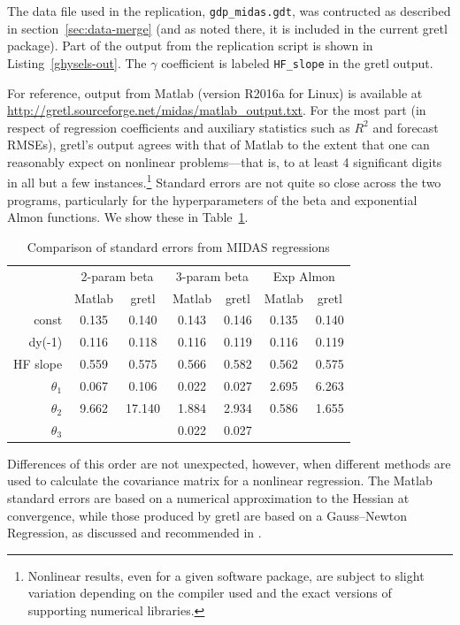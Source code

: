 \documentclass{article}
\begin{document}
The data file used in the replication, \texttt{gdp\_midas.gdt}, was
contructed as described in section~\ref{sec:data-merge} (and as noted
there, it is included in the current gretl package). Part of the
output from the replication script is shown in
Listing~\ref{ghysels-out}. The $\gamma$ coefficient is labeled
\texttt{HF\_slope} in the gretl output.

For reference, output from \textsf{Matlab} (version R2016a for Linux)
is available at
\url{http://gretl.sourceforge.net/midas/matlab_output.txt}. For the
most part (in respect of regression coefficients and auxiliary
statistics such as $R^2$ and forecast RMSEs), gretl's output agrees
with that of \textsf{Matlab} to the extent that one can reasonably
expect on nonlinear problems---that is, to at least 4 significant
digits in all but a few instances.\footnote{Nonlinear results, even
  for a given software package, are subject to slight variation
  depending on the compiler used and the exact versions of supporting
  numerical libraries.}  Standard errors are not quite so close across
the two programs, particularly for the hyperparameters of the beta and
exponential Almon functions. We show these in Table~\ref{tab:stderrs}.

\begin{table}[hbtp]
  \centering
  \begin{tabular}{rcccccc}
 & \multicolumn{2}{c}{2-param beta \qquad} & 
  \multicolumn{2}{c}{3-param beta \qquad} &
  \multicolumn{2}{c}{Exp Almon \qquad} \\[4pt]
 & \textsf{Matlab} & \textsf{gretl} & 
   \textsf{Matlab} & \textsf{gretl} &
   \textsf{Matlab} & \textsf{gretl} \\
const    & 0.135 & 0.140 & 0.143 & 0.146 & 0.135 & 0.140 \\
dy(-1)   & 0.116 & 0.118 & 0.116 & 0.119 & 0.116 & 0.119 \\
HF slope & 0.559 & 0.575 & 0.566 & 0.582 & 0.562 & 0.575 \\
$\theta_1$ & 0.067 & 0.106 & 0.022 & 0.027 & 2.695 & 6.263 \\
$\theta_2$ & 9.662 & 17.140 & 1.884 & 2.934 & 0.586 & 1.655 \\
$\theta_3$ &        &	     & 0.022 & 0.027 \\
\end{tabular}
  \caption{Comparison of standard errors from MIDAS regressions}
  \label{tab:stderrs}
\end{table}

Differences of this order are not unexpected, however, when different
methods are used to calculate the covariance matrix for a nonlinear
regression. The \textsf{Matlab} standard errors are based on a
numerical approximation to the Hessian at convergence, while those
produced by gretl are based on a Gauss--Newton Regression, as
discussed and recommended in \citet[chapter 6]{davidson-mackinnon04}.
\end{document}
